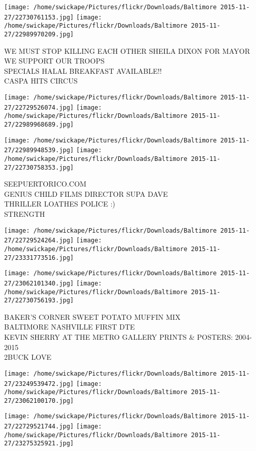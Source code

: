 \documentclass[10pt,letterpaper]{article}
\begin{document}
\texttt{[image: /home/swickape/Pictures/flickr/Downloads/Baltimore 2015-11-27/22730761153.jpg]}
\texttt{[image: /home/swickape/Pictures/flickr/Downloads/Baltimore 2015-11-27/22989970209.jpg]}

WE MUST STOP KILLING EACH OTHER SHEILA DIXON FOR MAYOR\\
WE SUPPORT OUR TROOPS\\
SPECIALS HALAL BREAKFAST AVAILABLE!!\\
CASPA HITS CIRCUS
\pagebreak

\texttt{[image: /home/swickape/Pictures/flickr/Downloads/Baltimore 2015-11-27/22729526074.jpg]}
\texttt{[image: /home/swickape/Pictures/flickr/Downloads/Baltimore 2015-11-27/22989968689.jpg]}

\texttt{[image: /home/swickape/Pictures/flickr/Downloads/Baltimore 2015-11-27/22989948539.jpg]}
\texttt{[image: /home/swickape/Pictures/flickr/Downloads/Baltimore 2015-11-27/22730758353.jpg]}

SEEPUERTORICO.COM\\
GENIUS CHILD FILMS DIRECTOR SUPA DAVE\\
THRILLER LOATHES POLICE :)\\
STRENGTH
\pagebreak

\texttt{[image: /home/swickape/Pictures/flickr/Downloads/Baltimore 2015-11-27/22729524264.jpg]}
\texttt{[image: /home/swickape/Pictures/flickr/Downloads/Baltimore 2015-11-27/23331773516.jpg]}

\texttt{[image: /home/swickape/Pictures/flickr/Downloads/Baltimore 2015-11-27/23062101340.jpg]}
\texttt{[image: /home/swickape/Pictures/flickr/Downloads/Baltimore 2015-11-27/22730756193.jpg]}

BAKER'S CORNER SWEET POTATO MUFFIN MIX\\
BALTIMORE NASHVILLE FIRST DTE\\
KEVIN SHERRY AT THE METRO GALLERY PRINTS \& POSTERS: 2004{-}2015\\
2BUCK LOVE
\pagebreak

\texttt{[image: /home/swickape/Pictures/flickr/Downloads/Baltimore 2015-11-27/23249539472.jpg]}
\texttt{[image: /home/swickape/Pictures/flickr/Downloads/Baltimore 2015-11-27/23062100170.jpg]}

\texttt{[image: /home/swickape/Pictures/flickr/Downloads/Baltimore 2015-11-27/22729521744.jpg]}
\texttt{[image: /home/swickape/Pictures/flickr/Downloads/Baltimore 2015-11-27/23275325921.jpg]}
\end{document}
